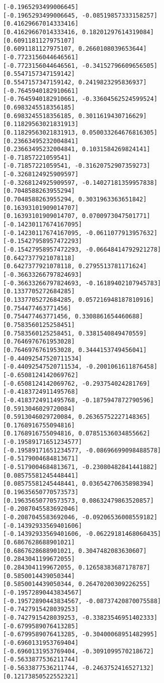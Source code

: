 \documentclass[11pt]{article}
\begin{document}
\begin{Verbatim}[commandchars=\\\{\}]
[-0.1965293499006645]
[-0.1965293499006645, -0.08519857333158257]
[0.41629667014333416]
[0.41629667014333416, 0.18201297614319084]
[0.6091181127975107]
[0.6091181127975107, 0.2660108039653644]
[-0.7723156044646561]
[-0.7723156044646561, -0.34152796609656505]
[0.5547157347159142]
[0.5547157347159142, 0.2419823295836937]
[-0.7645940182910661]
[-0.7645940182910661, -0.33604562524599524]
[0.6983245518356185]
[0.6983245518356185, 0.3011619430716629]
[0.11829563021831913]
[0.11829563021831913, 0.050033264676816305]
[0.23663495232004841]
[0.23663495232004841, 0.1031584269824141]
[-0.71857221059541]
[-0.71857221059541, -0.31620752907359273]
[-0.3268124925909597]
[-0.3268124925909597, -0.14027181359957838]
[0.7048588263955294]
[0.7048588263955294, 0.3031963363651842]
[0.16393101909014707]
[0.16393101909014707, 0.0700973047501771]
[-0.14230117674167095]
[-0.14230117674167095, -0.0611077913957632]
[-0.15427958957472293]
[-0.15427958957472293, -0.06648414792921278]
[0.6427377921078118]
[0.6427377921078118, 0.2795513781171624]
[-0.36633266797824693]
[-0.36633266797824693, -0.16189402107945783]
[0.1337705272684285]
[0.1337705272684285, 0.057216948187810916]
[0.754477463771456]
[0.754477463771456, 0.3308861654460688]
[0.7583560125258451]
[0.7583560125258451, 0.3381540849470559]
[0.7646976761953028]
[0.7646976761953028, 0.3444153749456041]
[-0.44092547520711534]
[-0.44092547520711534, -0.2001061611876458]
[-0.6508124142069762]
[-0.6508124142069762, -0.293754024281769]
[-0.4183724911495768]
[-0.4183724911495768, -0.1875947872790596]
[0.5913046029720084]
[0.5913046029720084, 0.26365752227148365]
[0.1768916755094816]
[0.1768916755094816, 0.07851536034855662]
[-0.19589171651234577]
[-0.19589171651234577, -0.08696699098488578]
[-0.5179004684813671]
[-0.5179004684813671, -0.23080482841441882]
[0.08575581245448441]
[0.08575581245448441, 0.03654270635898394]
[0.19635650770573573]
[0.19635650770573573, 0.08632479863520857]
[-0.2087045583692046]
[-0.2087045583692046, -0.09206536008559182]
[-0.14392933569401606]
[-0.14392933569401606, -0.06229181468060435]
[0.6867628688901021]
[0.6867628688901021, 0.3047482083630607]
[0.2843041199672055]
[0.2843041199672055, 0.12658383687178787]
[0.5850014439050344]
[0.5850014439050344, 0.26470200309226255]
[-0.19572890443834567]
[-0.19572890443834567, -0.08737420870075588]
[-0.7427915428039253]
[-0.7427915428039253, -0.33823546951402333]
[-0.6799589076413285]
[-0.6799589076413285, -0.30400068951482995]
[-0.6960131953769404]
[-0.6960131953769404, -0.3091099570218672]
[-0.5633877536211744]
[-0.5633877536211744, -0.2463752416527132]
[0.12173850522552321]

\end{Verbatim}
\end{document}

